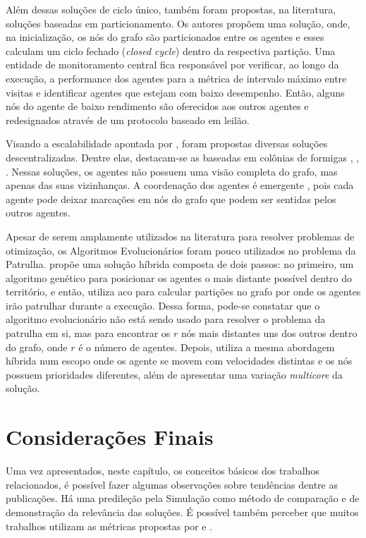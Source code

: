 Além dessas soluções de ciclo único, também foram propostas, na literatura, 
soluções baseadas em particionamento. Os autores 
\citep{Pippin:2013:PBT:2480362.2480378} propõem uma solução, onde, na 
inicialização, os nós do grafo são particionados entre os agentes e esses 
calculam um ciclo fechado (\textit{closed cycle}) dentro da respectiva partição. 
Uma entidade de monitoramento central fica responsável por verificar, ao longo 
da execução, a performance dos agentes para a métrica de intervalo máximo entre 
visitas e identificar agentes que estejam com baixo desempenho. Então, alguns 
nós do agente de baixo rendimento são oferecidos aos outros agentes e 
redesignados através de um protocolo baseado em leilão.

Visando a escalabilidade apontada por \citep{Almeida:2004:AAI}, foram propostas 
diversas soluções descentralizadas. Dentre elas, destacam-se as baseadas em 
colônias de formigas \citep{Koenig:2001:TCA:375735.376463}, 
\citep{Elor:2010:AMC:1884958.1884970}, \citep{6615158}. Nessas soluções, os 
agentes não possuem uma visão completa do grafo, mas apenas das suas 
vizinhanças. A coordenação dos agentes é emergente 
\citep{Machado:2002:MPE:1765317.1765332}, pois cada agente pode deixar marcações 
em nós do grafo que podem ser sentidas pelos outros agentes.

Apesar de serem amplamente utilizados na literatura para resolver problemas de 
otimização, os Algoritmos Evolucionários \citep{Luke2013Metaheuristics} foram 
pouco utilizados no problema da Patrulha. \citep{4630897} propõe uma solução 
híbrida composta de dois passos: no primeiro, um algoritmo genético para 
posicionar os agentes o mais distante possível dentro do território, e então, 
utiliza \ac{aco} para calcular partições no grafo por onde os agentes irão 
patrulhar durante a execução. Dessa forma, pode-se constatar que o algoritmo 
evolucionário não está sendo usado para resolver o problema da patrulha em si, 
mas para encontrar os $r$ nós mais distantes uns dos outros dentro do grafo, 
onde $r$ é o número de agentes. Depois, \citep{6900280} utiliza a mesma 
abordagem híbrida num escopo onde os agente se movem com velocidades distintas e 
os nós possuem prioridades diferentes, além de apresentar uma variação 
\textit{multicore} da solução.

\section{Considerações Finais}

Uma vez apresentados, neste capítulo, os conceitos básicos dos trabalhos 
relacionados, é possível fazer algumas observações sobre tendências dentre as 
publicações. Há uma predileção pela Simulação como método de comparação e de 
demonstração da relevância das soluções. É possível também perceber que muitos 
trabalhos utilizam as métricas propostas por 
\citep{Machado:2002:MPE:1765317.1765332} e \citep{sampaiophd}.

